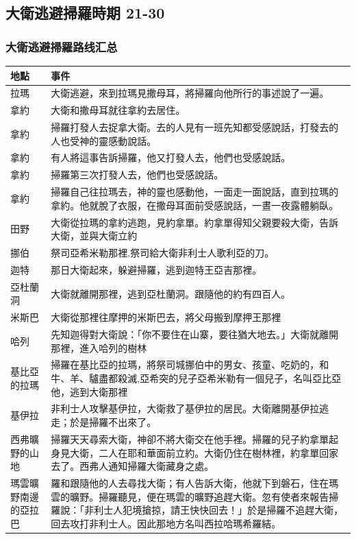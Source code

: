 \subsection{大衛逃避掃羅時期 21-30}
\subsubsection{大衛逃避掃羅路线汇总}
\begin{table}[H]
\centering 
\begin{tabular}{|p{1.5cm}|p{15cm}|}
\hline
\hline
地點 & 事件\\\hline\hline
拉瑪 & 大衛逃避，來到拉瑪見撒母耳，將掃羅向他所行的事述說了一遍。 \\\hline
拿約 & 大衛和撒母耳就往拿約去居住。  \\\hline
拿約 & 掃羅打發人去捉拿大衛。去的人見有一班先知都受感說話，打發去的人也受神的靈感動說話。  \\\hline
拿約 & 有人將這事告訴掃羅，他又打發人去，他們也受感說話。 \\\hline
拿約  & 掃羅第三次打發人去，他們也受感說話。  \\\hline
拿約&掃羅自己往拉瑪去，神的靈也感動他，一面走一面說話，直到拉瑪的拿約。他就脫了衣服，在撒母耳面前受感說話，一晝一夜露體躺臥。\\\hline
田野 & 大衛從拉瑪的拿約逃跑，見約拿單。約拿單得知父親要殺大衛，告訴大衛，並與大衛立約 \\\hline
挪伯 &祭司亞希米勒那裡.祭司給大衛非利士人歌利亞的刀。\\\hline
迦特 &那日大衛起來，躲避掃羅，逃到迦特王亞吉那裡。 \\\hline
亞杜蘭洞 &大衛就離開那裡，逃到亞杜蘭洞。跟隨他的約有四百人。 \\\hline
米斯巴&大衛從那裡往摩押的米斯巴去，將父母搬到摩押王那裡 \\\hline
哈列&先知迦得對大衛說：「你不要住在山寨，要往猶大地去。」大衛就離開那裡，進入哈列的樹林\\\hline
基比亞的拉瑪&掃羅在基比亞的拉瑪，將祭司城挪伯中的男女、孩童、吃奶的，和牛、羊、驢盡都殺滅,亞希突的兒子亞希米勒有一個兒子，名叫亞比亞他，逃到大衛那裡\\\hline
基伊拉& 非利士人攻擊基伊拉，大衛救了基伊拉的居民。大衛離開基伊拉逃走；於是掃羅不出來了。\\\hline
西弗曠野的山地&掃羅天天尋索大衛，神卻不將大衛交在他手裡。掃羅的兒子約拿單起身見大衛，二人在耶和華面前立約。大衛仍住在樹林裡，約拿單回家去了。西弗人通知掃羅大衛藏身之處。 \\\hline
瑪雲曠野南邊的亞拉巴& 羅和跟隨他的人去尋找大衛；有人告訴大衛，他就下到磐石，住在瑪雲的曠野。掃羅聽見，便在瑪雲的曠野追趕大衛。忽有使者來報告掃羅說：「非利士人犯境搶掠，請王快快回去！」於是掃羅不追趕大衛，回去攻打非利士人。因此那地方名叫西拉哈瑪希羅結。  \\\hline

\end{tabular}
\end{table}
